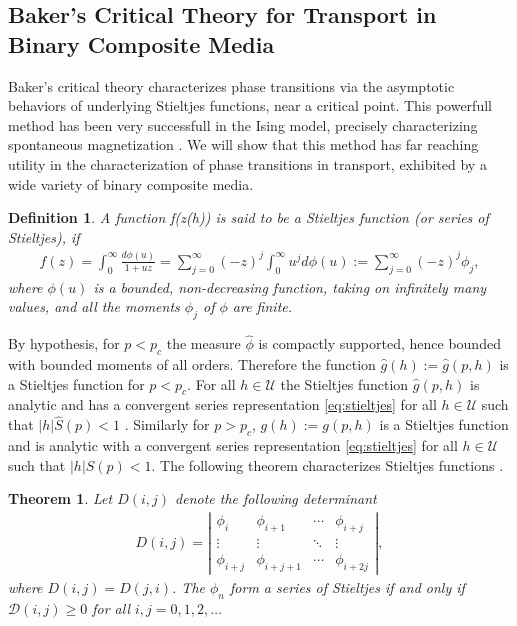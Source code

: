 \documentclass[english,12pt,jmp,graphicx]{revtex4-1}
\newtheorem{theorem}{Theorem}[section]
\newtheorem{definition}{Definition}[section]
\newcommand{\ph}{\hat{\phi}}
\begin{document}
\subsection{Baker's Critical Theory for Transport in Binary Composite
  Media}
%
Baker's critical theory characterizes phase transitions via the
asymptotic behaviors of underlying Stieltjes functions, near a critical 
point. This powerfull method has been very successfull in the Ising
model, precisely characterizing spontaneous magnetization
\cite{Baker-1990}. We will show that this method has far reaching
utility in the characterization of phase transitions in transport,
exhibited by a wide variety of binary composite media.   
%
\begin{definition}  \label{def:stieltjes}
  A function f(z(h)) is said to be a \emph{Stieltjes function} (or
  \emph{series of Stieltjes}), if 
  \begin{align} \label{eq:stieltjes}
    f(z)=\int_0^\infty\frac{d\phi(u)}{1+uz}
    =\sum_{j =0}^\infty(-z)^j\int_0^\infty u^jd\phi(u)
    :=\sum_{j =0}^\infty(-z)^j\phi_j,
  \end{align}
  where $\phi(u)$ is a bounded, non-decreasing function, taking on
  infinitely many values, and all the moments $\phi_j$ of $\phi$ are
  finite.  
\end{definition}
%
By hypothesis, for $p<p_c$ the measure $\ph$ is compactly supported,
hence bounded with bounded moments of all orders. Therefore the
function $\hat{g}(h):=\hat{g}(p,h)$ is a Stieltjes function for
$p<p_c$. For all $h\in\mathcal{U}$ the Stieltjes function $\hat{g}(p,h)$
is analytic and has a convergent series representation
\eqref{eq:stieltjes} for all $h\in\mathcal{U}$ such that
$|h|\hat{S}(p)<1$ \cite{Golden:PRL-3935,Golden:CMP-473}. Similarly for
$p>p_c$, $g(h):=g(p,h)$ is a Stieltjes function and is analytic
with a convergent series representation \eqref{eq:stieltjes} for all
$h\in\mathcal{U}$ such that $|h|S(p)<1$. The following theorem
characterizes Stieltjes functions \cite{Baker-1990}.  
% 
\begin{theorem} \label{thm:stieltjes_Characterization}
   Let $D(i,j)$ denote the following determinant
    \begin{align} \label{eq:Detf} 
     D(i,j) = \left|
                 \begin{matrix}
                   \phi_i&\phi_{i+1}&\cdots&\phi_{i+j}\\ 
                   \vdots&\vdots&\ddots&\vdots\\
                   \phi_{i+j}&\phi_{i+j+1}&\cdots&\phi_{i+2j}                            
                   \end{matrix}
              \right| ,    
   \end{align}
   where $D(i,j)=D(j,i)$. The $\phi_n$ form a series of Stieltjes if and
   only if $\mathcal{D}(i,j) \geq 0$ for all $i,j =0,1,2,\ldots$

 \end{theorem}
\end{document}
